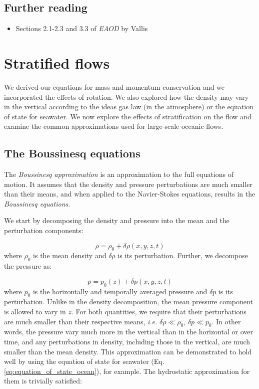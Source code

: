 \documentclass[12pt]{article}
\numberwithin{equation}{section}
\numberwithin{figure}{section}
\numberwithin{table}{section}
\begin{document}
\subsection*{Further reading}

\begin{itemize}
  \item Sections 2.1-2.3 and 3.3 of \textit{EAOD} by Vallis
\end{itemize}

\newpage
\section{Stratified flows}

We derived our equations for mass and momentum conservation and we incorporated
the effects of rotation.
We also explored how the density may vary in the vertical according to the
ideas gas law (in the atmosphere) or the equation of state for seawater.
We now explore the effects of stratification on the flow and examine the
common approximations used for large-scale oceanic flows.

\subsection{The Boussinesq equations}

The \textit{Boussinesq approximation} is an
approximation to the full equations of motion.
It assumes that the density and pressure perturbations are much smaller than
their means, and when applied to the Navier-Stokes equations, results in the
\textit{Boussinesq equations}.

We start by decomposing the density and pressure into the mean and the
perturbation components:

\begin{equation}
  \rho = \rho_0 + \delta \rho(x, y, z, t)
  \label{eq:boussinesq_density}
\end{equation}
where $\rho_0$ is the mean density and $\delta \rho$ is its perturbation.
Further, we decompose the pressure as:

\begin{equation}
  p = p_0(z) + \delta p(x, y, z, t)
  \label{eq:boussinesq_pressure}
\end{equation}
where $p_0$ is the horizontally and temporally averaged pressure and $\delta p$
is its perturbation.
Unlike in the density decomposition, the mean pressure component is allowed to
vary in $z$.
For both quantities, we require that their perturbations are much smaller
than their respective means, \textit{i.e.} $\delta \rho \ll \rho_0$, $\delta p \ll p_0$.
In other words, the pressure vary much more in the vertical than in the
horizontal or over time, and any perturbations in density, including those in
the vertical, are much smaller than the mean density.
This approximation can be demonstrated to hold well by using the equation of
state for seawater (Eq. \ref{eq:equation_of_state_ocean}), for example.
The hydrostatic approximation for them is trivially satisfied:
\end{document}
